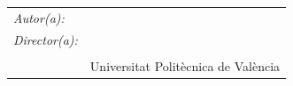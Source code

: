 \begin{titlepage}
\noindent
\begin{tabular}{ll}
\textit{Autor(a):} & \NombreAutor{}  \\ 
\textit{Director(a):} & \NombreDirector{}  \\ 
                & \Departamento{} \\
                & Universitat Politècnica de València  \\


\end{tabular} 

\end{titlepage}
